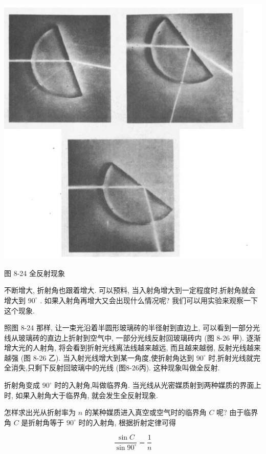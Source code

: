 \documentclass[10pt]{article}
\begin{document}
\begin{center}
\includegraphics[max width=1.0\textwidth]{images/01913056-1f15-74d8-9184-9aab52c9d66b_264_591863.jpg}
\end{center}

图 8-24 全反射现象

不断增大, 折射角也跟着增大. 可以预料, 当入射角增大到一定程度时,折射角就会增大到 \({90}^{ \circ }\) . 如果入射角再增大又会出现什么情况呢? 我们可以用实验来观察一下这个现象.

照图 8-24 那样, 让一束光沿着半圆形玻璃砖的半径射到直边上, 可以看到一部分光线从玻璃砖的直边上折射到空气中, 一部分光线反射回玻璃砖内 (图 8-26 甲). 逐渐增大光的人射角, 将会看到折射光线离法线越来越远, 而且越来越弱, 反射光线越来越强 (图 8-26 乙). 当入射光线增大到某一角度,使折射角达到 \({90}^{ \circ }\) 时,折射光线就完全消失,只剩下反射回玻璃中的光线 (图8-26丙). 这种现象叫做全反射.

折射角变成 \({90}^{ \circ }\) 时的入射角,叫做临界角. 当光线从光密媒质射到两种媒质的界面上时, 如果入射角大于临界角, 就会发生全反射现象.

怎样求出光从折射率为 \(n\) 的某种媒质进入真空或空气时的临界角 \(C\) 呢? 由于临界角 \(C\) 是折射角等于 \({90}^{ \circ }\) 时的入射角, 根据折射定律可得

\[
\frac{\sin C}{\sin {90}^{ \circ }} = \frac{1}{n}
\]
\end{document}
